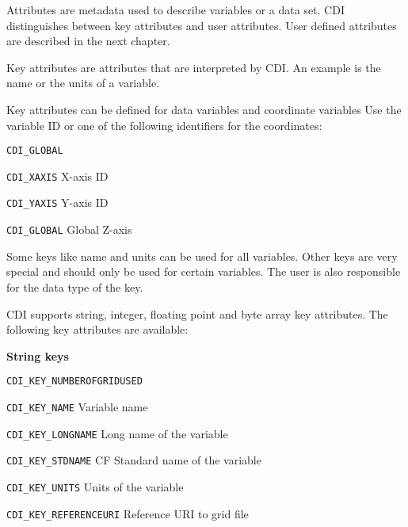 Attributes are metadata used to describe variables or a data set.
CDI distinguishes between key attributes and user attributes.
User defined attributes are described in the next chapter.

Key attributes are attributes that are interpreted by CDI.
An example is the name or the units of a variable.

Key attributes can be defined for data variables and coordinate variables
Use the variable ID or one of the following identifiers for the coordinates:

\vspace*{3mm}
\hspace*{8mm}\begin{minipage}{15cm}
\begin{deflist}{\large\texttt{CDI\_GLOBAL \ \ }}
\item[\large\texttt{CDI\_XAXIS}]   X-axis ID
\item[\large\texttt{CDI\_YAXIS}]   Y-axis ID 
\item[\large\texttt{CDI\_GLOBAL}]   Global Z-axis
\end{deflist}
\end{minipage}
\vspace*{4mm}

Some keys like name and units can be used for all variables.
Other keys are very special and should only be used for certain variables.
The user is also responsible for the data type of the key.

CDI supports string, integer, floating point and byte array key attributes.
The following key attributes are available:

\textbf{String keys}

\vspace*{3mm}
\hspace*{8mm}\begin{minipage}{15cm}
\begin{deflist}{\large\texttt{CDI\_KEY\_NUMBEROFGRIDUSED \ \ }}
\item[\large\texttt{CDI\_KEY\_NAME}]   Variable name
\item[\large\texttt{CDI\_KEY\_LONGNAME}]   Long name of the variable
\item[\large\texttt{CDI\_KEY\_STDNAME}]   CF Standard name of the variable
\item[\large\texttt{CDI\_KEY\_UNITS}]   Units of the variable
\item[\large\texttt{CDI\_KEY\_REFERENCEURI}]   Reference URI to grid file
\end{deflist}
\end{minipage}
\vspace*{4mm}

